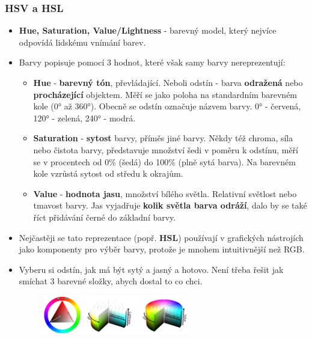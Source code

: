 \subsubsection{HSV a HSL}
\begin{itemize}
	\item \textbf{Hue, Saturation, Value/Lightness} - barevný model, který nejvíce odpovídá lidskému vnímání barev.
	\item Barvy popisuje pomocí 3 hodnot, které však samy barvy nereprezentují:
	\begin{itemize}
		\item \textbf{Hue} - \textbf{barevný tón}, převládající. Neboli odstín - barva \textbf{odražená} nebo \textbf{procházející} objektem. Měří se jako poloha na standardním barevném kole (\ang{0} až \ang{360}). Obecně se odstín označuje názvem barvy. \ang{0} - červená, \ang{120} - zelená, \ang{240} - modrá.
		\item \textbf{Saturation} - \textbf{sytost} barvy, příměs jiné barvy. Někdy též chroma, síla nebo čistota barvy, představuje množství šedi v poměru k odstínu, měří se v procentech od 0\% (šedá) do 100\% (plně sytá barva). Na barevném kole vzrůstá sytost od středu k okrajům.
		\item \textbf{Value} - \textbf{hodnota jasu}, množství bílého světla. Relativní světlost nebo tmavost barvy. Jas vyjadřuje \textbf{kolik světla barva odráží}, dalo by se také říct přidávání černé do základní barvy.
	\end{itemize}
	\item Nejčastěji se tato reprezentace (popř. \textbf{HSL}) používají v grafických nástrojích jako komponenty pro výběr barvy, protože je mnohem intuitivnější než RGB. 
	\item Vyberu si odstín, jak má být sytý a jasný a hotovo. Není třeba řešit jak smíchat 3 barevné složky, abych dostal to co chci.
	\begin{figure}[H]
	\centering
	\includegraphics[width=0.6\textwidth]{assets/1_hsv_hsl}
	\end{figure}
\end{itemize}

